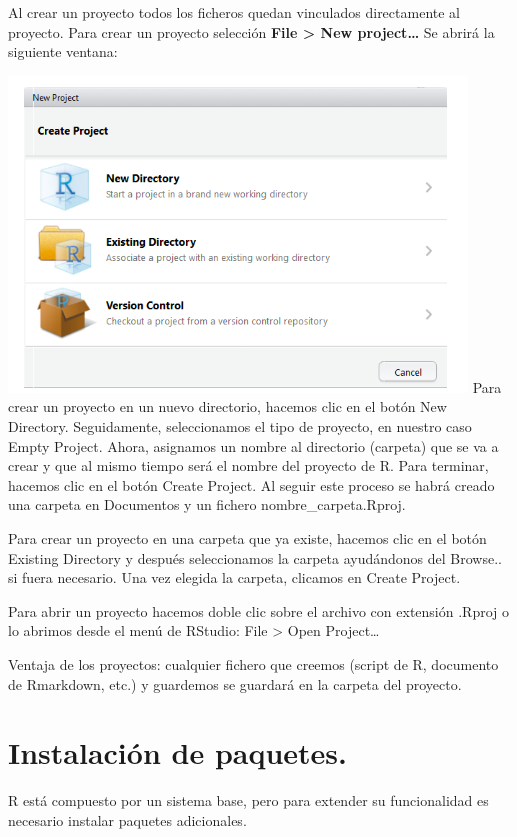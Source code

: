 \documentclass[
]{book}
\begin{document}
Al crear un proyecto todos los ficheros quedan vinculados directamente al proyecto. Para crear un proyecto selección \textbf{File \textgreater{} New project\ldots{}} Se abrirá la siguiente ventana:

\includegraphics{imagenes/09.png}
Para crear un proyecto en un nuevo directorio, hacemos clic en el botón New Directory. Seguidamente, seleccionamos el tipo de proyecto, en nuestro caso Empty Project. Ahora, asignamos un nombre al directorio (carpeta) que se va a crear y que al mismo tiempo será el nombre del proyecto de R. Para terminar, hacemos clic en el botón Create Project. Al seguir este proceso se habrá creado una carpeta en Documentos y un fichero nombre\_carpeta.Rproj.

Para crear un proyecto en una carpeta que ya existe, hacemos clic en el botón Existing Directory y después seleccionamos la carpeta ayudándonos del Browse.. si fuera necesario. Una vez elegida la carpeta, clicamos en Create Project.

Para abrir un proyecto hacemos doble clic sobre el archivo con extensión .Rproj o lo abrimos desde el menú de RStudio: File \textgreater{} Open Project\ldots{}

Ventaja de los proyectos: cualquier fichero que creemos (script de R, documento de Rmarkdown, etc.) y guardemos se guardará en la carpeta del proyecto.

\hypertarget{instalaciuxf3n-de-paquetes.}{%
\section{Instalación de paquetes.}\label{instalaciuxf3n-de-paquetes.}}

R está compuesto por un sistema base, pero para extender su funcionalidad es necesario instalar paquetes adicionales.
\end{document}
